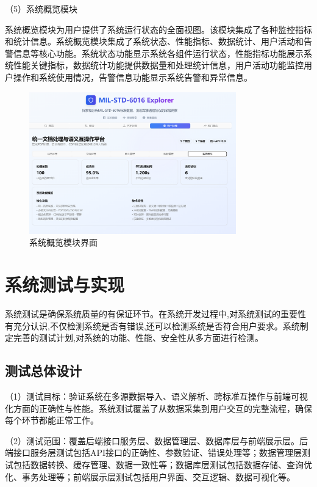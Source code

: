 （5）系统概览模块

系统概览模块为用户提供了系统运行状态的全面视图。该模块集成了各种监控指标和统计信息。系统概览模块集成了系统状态、性能指标、数据统计、用户活动和告警信息等核心功能。系统状态功能显示系统各组件运行状态，性能指标功能展示系统性能关键指标，数据统计功能提供数据量和处理统计信息，用户活动功能监控用户操作和系统使用情况，告警信息功能显示系统告警和异常信息。

\begin{figure}[H]
\centering
\includegraphics[width=0.8\textwidth]{chapters/fig-0/front_overview.png}
\caption{系统概览模块界面}
\label{fig:frontend-overview}
\end{figure}




\section{系统测试与实现}

系统测试是确保系统质量的有保证环节。在系统开发过程中,对系统测试的重要性有充分认识,不仅检测系统是否有错误,还可以检测系统是否符合用户要求。系统制定完善的测试计划,对系统的功能、性能、安全性从多方面进行检测。

\subsection{测试总体设计}

（1）测试目标：验证系统在多源数据导入、语义解析、跨标准互操作与前端可视化方面的正确性与性能。系统测试覆盖了从数据采集到用户交互的完整流程，确保每个环节都能正常工作。

（2）测试范围：覆盖后端接口服务层、数据管理层、数据库层与前端展示层。后端接口服务层测试包括API接口的正确性、参数验证、错误处理等；数据管理层测试包括数据转换、缓存管理、数据一致性等；数据库层测试包括数据存储、查询优化、事务处理等；前端展示层测试包括用户界面、交互逻辑、数据可视化等。

